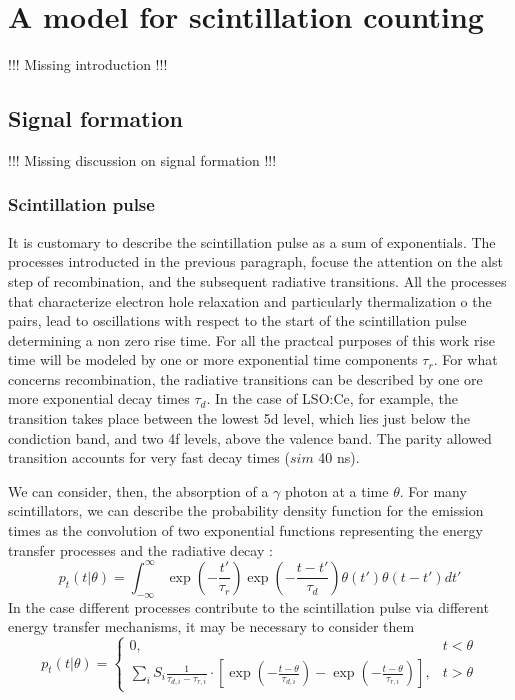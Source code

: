 \chapter{A model for scintillation counting}

!!! Missing introduction !!!

\section{Signal formation}

!!! Missing discussion on signal formation !!!

\subsection{Scintillation pulse}
It is customary to describe \cite{Hyman1963} the scintillation pulse as a sum of exponentials. The processes introducted in the previous paragraph, focuse the attention on the alst step of recombination, and the subsequent radiative transitions. 
All the processes that characterize electron hole relaxation and particularly thermalization o the pairs, lead to oscillations with respect to the start of the scintillation pulse determining a non zero rise time.
For all the practcal purposes of this work rise time will be modeled by one or more exponential time components $\tau _{r}$. 
For what concerns recombination, the radiative transitions can be described by one ore more exponential decay times $\tau _{d}$.
In the case of LSO:Ce, for example, the transition takes place between the lowest 5d level, which lies just below the condiction band, and two 4f levels, above the valence band. The parity allowed transition accounts for very fast decay times ($sim$ 40 ns).

We can consider, then, the absorption of a $\gamma$ photon at a time $\theta$. 
For many scintillators, we can describe the probability density function for the emission times as the convolution of two exponential functions representing the energy transfer processes and the radiative decay \cite{Shao2006}:
\begin{equation}
p_{t}(t|\theta) = \int _{-\infty}^{\infty} \exp{\left( -\frac{t'}{\tau _{r}}\right) } \exp{\left(-\frac{t-t'}{\tau _{d}}\right) } \theta (t') \theta (t-t') dt'
\end{equation}
In the case different processes contribute to the scintillation pulse via different energy transfer mechanisms, it may be necessary to consider them \cite{Seifert2012}
\begin{equation}
p _{t}(t|\theta) = \begin{cases} 0, & t < \theta \\ \sum _{i} S_{i} \frac{1}{\tau _{d, i} - \tau _{r, i}} \cdot \left[ \exp{\left( -\frac{t-\theta}{\tau _{d,i}}\right)} - \exp{\left( -\frac{t-\theta}{\tau _{r,i}}\right) } \right], & t > \theta \end{cases}
\end{equation}

